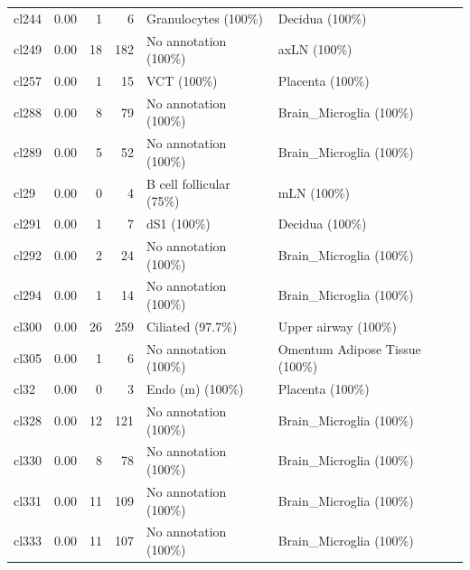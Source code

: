 \begin{table}[ht!]
\begin{tabular}{lrrrll}
  cl244 & 0.00 &   1 &   6 & Granulocytes (100\%) & Decidua (100\%) \\ 
  cl249 & 0.00 &  18 & 182 & No annotation (100\%) & axLN (100\%) \\ 
  cl257 & 0.00 &   1 &  15 & VCT (100\%) & Placenta (100\%) \\ 
  cl288 & 0.00 &   8 &  79 & No annotation (100\%) & Brain\_Microglia (100\%) \\ 
  cl289 & 0.00 &   5 &  52 & No annotation (100\%) & Brain\_Microglia (100\%) \\ 
  cl29 & 0.00 &   0 &   4 & B cell follicular (75\%) & mLN (100\%) \\ 
  cl291 & 0.00 &   1 &   7 & dS1 (100\%) & Decidua (100\%) \\ 
  cl292 & 0.00 &   2 &  24 & No annotation (100\%) & Brain\_Microglia (100\%) \\ 
  cl294 & 0.00 &   1 &  14 & No annotation (100\%) & Brain\_Microglia (100\%) \\ 
  cl300 & 0.00 &  26 & 259 & Ciliated (97.7\%) & Upper airway (100\%) \\ 
  cl305 & 0.00 &   1 &   6 & No annotation (100\%) & Omentum Adipose Tissue (100\%) \\ 
  cl32 & 0.00 &   0 &   3 & Endo (m) (100\%) & Placenta (100\%) \\ 
  cl328 & 0.00 &  12 & 121 & No annotation (100\%) & Brain\_Microglia (100\%) \\ 
  cl330 & 0.00 &   8 &  78 & No annotation (100\%) & Brain\_Microglia (100\%) \\ 
  cl331 & 0.00 &  11 & 109 & No annotation (100\%) & Brain\_Microglia (100\%) \\ 
  cl333 & 0.00 &  11 & 107 & No annotation (100\%) & Brain\_Microglia (100\%) \\ 
   \bottomrule
\end{tabular}
\end{table}



